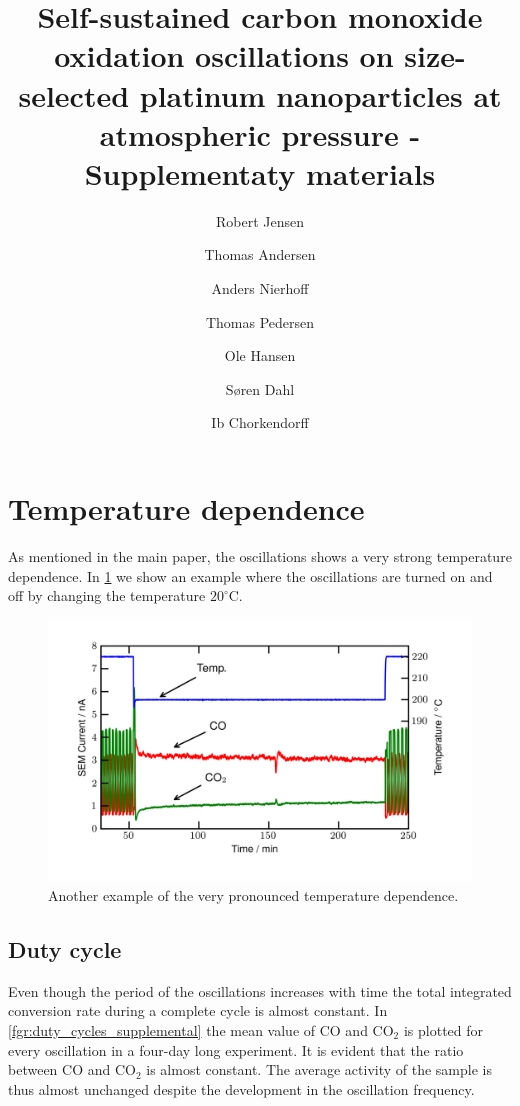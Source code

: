 \documentclass[journal=jacsat,manuscript=article]{achemso}
\author{Robert Jensen}
\author{Thomas Andersen}
\author{Anders Nierhoff}
\author{Thomas Pedersen}
\author{Ole Hansen}
\author{S\o ren Dahl}
\author{Ib Chorkendorff}
\title[Oxidation oscillations at atmospheric pressure]
{Self-sustained carbon monoxide oxidation oscillations on size-selected platinum nanoparticles at atmospheric pressure - Supplementaty materials}
\begin{document}
\section{Temperature dependence}
As mentioned in the main paper, the oscillations shows a very strong
temperature dependence. In \ref{fgr:temperature_dependence_supplemental}
we show an example where the oscillations are turned on and off by changing the
temperature $20^\circ$C.

\begin{figure}[h]
\centering
  \includegraphics[width=12cm]{temperature_dependence_supplemental.png}
  \caption{Another example of the very pronounced temperature dependence.}
  \label{fgr:temperature_dependence_supplemental}
\end{figure}

\subsection{Duty cycle}
Even though the period of the oscillations increases with time the total
integrated conversion rate during a complete cycle is almost constant. In
\ref{fgr:duty_cycles_supplemental} the mean value of CO and
CO$_2$ is plotted for every oscillation in a four-day long experiment. It is
evident that the ratio between CO and CO$_2$ is almost constant. The
average activity of the sample is thus almost unchanged despite the development in
the oscillation frequency.
\end{document}
